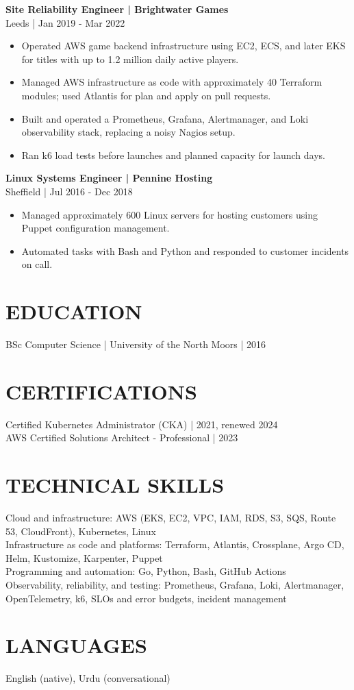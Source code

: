 \documentclass[11pt,a4paper]{article}
\begin{document}
\textbf{Site Reliability Engineer | Brightwater Games}\\
Leeds | Jan 2019 - Mar 2022
\begin{itemize}
\item Operated AWS game backend infrastructure using EC2, ECS, and later EKS for titles with up to 1.2 million daily active players.
\item Managed AWS infrastructure as code with approximately 40 Terraform modules; used Atlantis for plan and apply on pull requests.
\item Built and operated a Prometheus, Grafana, Alertmanager, and Loki observability stack, replacing a noisy Nagios setup.
\item Ran k6 load tests before launches and planned capacity for launch days.
\end{itemize}

\textbf{Linux Systems Engineer | Pennine Hosting}\\
Sheffield | Jul 2016 - Dec 2018
\begin{itemize}
\item Managed approximately 600 Linux servers for hosting customers using Puppet configuration management.
\item Automated tasks with Bash and Python and responded to customer incidents on call.
\end{itemize}

\section*{EDUCATION}
BSc Computer Science | University of the North Moors | 2016

\section*{CERTIFICATIONS}
Certified Kubernetes Administrator (CKA) | 2021, renewed 2024\\
AWS Certified Solutions Architect - Professional | 2023

\section*{TECHNICAL SKILLS}
Cloud and infrastructure: AWS (EKS, EC2, VPC, IAM, RDS, S3, SQS, Route 53, CloudFront), Kubernetes, Linux\\
Infrastructure as code and platforms: Terraform, Atlantis, Crossplane, Argo CD, Helm, Kustomize, Karpenter, Puppet\\
Programming and automation: Go, Python, Bash, GitHub Actions\\
Observability, reliability, and testing: Prometheus, Grafana, Loki, Alertmanager, OpenTelemetry, k6, SLOs and error budgets, incident management

\section*{LANGUAGES}
English (native), Urdu (conversational)
\end{document}
